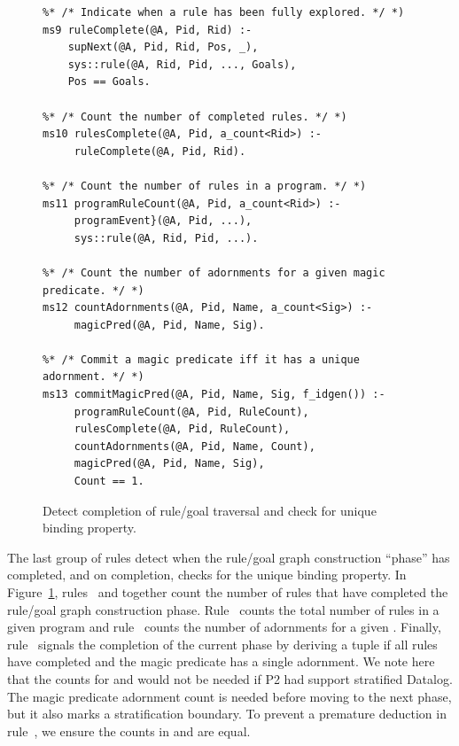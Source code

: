 \begin{figure}[!t]
\ssp
\centering
\begin{lstlisting}
%* /* Indicate when a rule has been fully explored. */ *)
ms9 ruleComplete(@A, Pid, Rid) :-
    supNext(@A, Pid, Rid, Pos, _),
    sys::rule(@A, Rid, Pid, ..., Goals),
    Pos == Goals. 
	       
%* /* Count the number of completed rules. */ *)
ms10 rulesComplete(@A, Pid, a_count<Rid>) :-
     ruleComplete(@A, Pid, Rid).
	        
%* /* Count the number of rules in a program. */ *)
ms11 programRuleCount(@A, Pid, a_count<Rid>) :-
     programEvent}(@A, Pid, ...),
     sys::rule(@A, Rid, Pid, ...).
	
%* /* Count the number of adornments for a given magic predicate. */ *)
ms12 countAdornments(@A, Pid, Name, a_count<Sig>) :-
     magicPred(@A, Pid, Name, Sig).
	       
%* /* Commit a magic predicate iff it has a unique adornment. */ *)
ms13 commitMagicPred(@A, Pid, Name, Sig, f_idgen()) :-
     programRuleCount(@A, Pid, RuleCount),
     rulesComplete(@A, Pid, RuleCount),
     countAdornments(@A, Pid, Name, Count),
     magicPred(@A, Pid, Name, Sig),
     Count == 1.
\end{lstlisting}
\caption{\label{ch:magic:fig:magic4}Detect completion of rule/goal traversal 
and check for unique binding property.}
\end{figure}

The last group of rules detect when the rule/goal graph construction ``phase''
has completed, and on completion, checks for the unique binding property.  In
Figure~\ref{ch:magic:fig:magic4}, rules~ and  together count
the number of rules that have completed the rule/goal graph construction phase.
Rule~ counts the total number of rules in a given program and
rule~ counts the number of adornments for a given .
Finally, rule~ signals the completion of the current phase by deriving
a  tuple if all rules have completed and the magic
predicate has a single adornment.  We note here that the counts for
 and  would not be needed if P2 had
support stratified Datalog.  The magic predicate adornment count is needed
before moving to the next phase, but it also marks a stratification boundary.
To prevent a premature  deduction in rule~, we
ensure the counts in  and  are equal.


